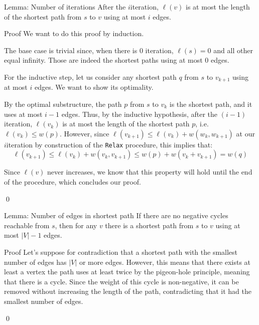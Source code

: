 \documentclass[a4paper]{article}
\begin{document}
\begin{parag}{Lemma: Number of iterations}
    After the $i$\Th iteration, $\ell \left(v\right)$ is at most the length of the shortest path from $s$ to $v$ using at most $i$ edges.

    \begin{subparag}{Proof}
        We want to do this proof by induction.

        The base case is trivial since, when there is 0 iteration, $\ell \left(s\right) = 0$ and all other equal infinity. Those are indeed the shortest paths using at most 0 edges.

        For the inductive step, let us consider any shortest path $q$ from $s$ to $v_{k+1}$ using at most $i$ edges. We want to show its optimality.

        By the optimal substructure, the path $p$ from $s$ to $v_{k}$ is the shortest path, and it uses at most $i-1$ edges. Thus, by the inductive hypothesis, after the $\left(i-1\right)$\Th iteration, $\ell \left(v_k\right)$ is at most the length of the shortest path $p$, i.e. $\ell \left(v_k\right) \leq w\left(p\right)$. However, since $\ell \left(v_{k+1}\right) \leq \ell \left(v_k\right) + w\left(w_k, w_{k+1}\right)$ at our $i$\Th iteration by construction of the \texttt{Relax} procedure, this implies that: 
        \[\ell \left(v_{k+1}\right) \leq \ell \left(v_k\right) + w\left(v_{k}, v_{k+1}\right) \leq w\left(p\right) + w\left(v_k + v_{k+1}\right) = w\left(q\right)\]

        Since $\ell\left(v\right)$ never increases, we know that this property will hold until the end of the procedure, which concludes our proof.
        
        \qed
    \end{subparag}
\end{parag}

\begin{parag}{Lemma: Number of edges in shortest path}
   If there are no negative cycles reachable from $s$, then for any $v$ there is a shortest path from $s$ to $v$ using at most $\left|V\right|-1$ edges.

    \begin{subparag}{Proof}
        Let's suppose for contradiction that a shortest path with the smallest number of edges has $\left|V\right|$ or more edges. However, this means that there exists at least a vertex the path uses at least twice by the pigeon-hole principle, meaning that there is a cycle. Since the weight of this cycle is non-negative, it can be removed without increasing the length of the path, contradicting that it had the smallest number of edges.

        \qed
    \end{subparag}
\end{parag}
\end{document}
